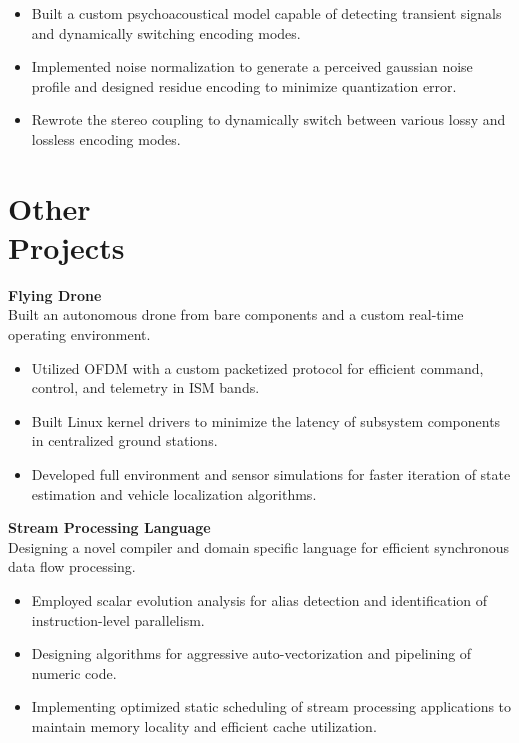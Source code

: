 \documentclass[margin,line]{resume}
\begin{document}
\begin{resume}
	\begin{itemize}
	\item Built a custom psychoacoustical model capable of detecting
              transient signals and dynamically switching encoding modes.
	\item Implemented noise normalization to generate a perceived gaussian noise
            profile and designed residue encoding to minimize
            quantization error.
	\item Rewrote the stereo coupling to dynamically switch between
	      various lossy and lossless encoding modes.
	\end{itemize}

    \section{\mysidestyle Other\\Projects}

    \textbf{Flying Drone}\\
    Built an autonomous drone from bare components and a custom real-time operating environment.

    \begin{itemize}
      \item Utilized OFDM with a custom packetized protocol for efficient command, control,
            and telemetry in ISM bands.
      \item Built Linux kernel drivers to minimize the latency of subsystem components in centralized
            ground stations.
      \item Developed full environment and sensor simulations for faster iteration of state estimation
            and vehicle localization algorithms.
    \end{itemize}

    \textbf{Stream Processing Language}\\
    Designing a novel compiler and domain specific language for efficient synchronous data flow processing.

    \begin{itemize}
        \item Employed scalar evolution analysis for alias detection and identification of
              instruction-level parallelism.
        \item Designing algorithms for aggressive auto-vectorization and pipelining of numeric code.
        \item Implementing optimized static scheduling of stream processing applications to maintain
              memory locality and efficient cache utilization.
    \end{itemize}


\end{resume}
\end{document}
